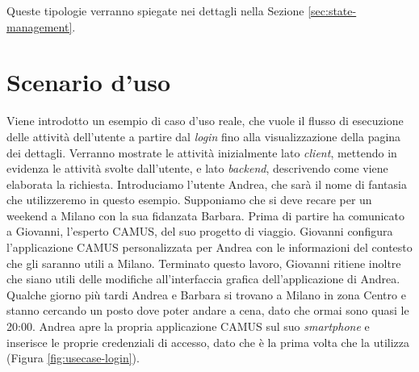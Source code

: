 Queste tipologie verranno spiegate nei dettagli nella Sezione \ref{sec:state-management}.

\section{Scenario d'uso}
Viene introdotto un esempio di caso d'uso reale, che vuole il flusso di esecuzione delle attività dell'utente a partire dal \emph{login} fino alla visualizzazione della pagina dei dettagli. Verranno mostrate le attività inizialmente lato \emph{client}, mettendo in evidenza le attività svolte dall’utente, e lato \emph{backend}, descrivendo come viene elaborata la richiesta.
Introduciamo l'utente Andrea, che sarà il nome di fantasia che utilizzeremo in questo esempio. Supponiamo che si deve recare per un weekend a Milano con la sua fidanzata Barbara. Prima di partire ha comunicato a Giovanni, l’esperto CAMUS, del suo progetto di viaggio. Giovanni configura l’applicazione CAMUS personalizzata per Andrea con le informazioni del contesto che gli saranno utili a Milano. Terminato questo lavoro, Giovanni ritiene inoltre che siano utili delle modifiche all'interfaccia grafica dell'applicazione di Andrea.
Qualche giorno più tardi Andrea e Barbara si trovano a Milano in zona Centro e stanno cercando un posto dove poter andare a cena, dato che ormai sono quasi le 20:00. Andrea apre la propria applicazione CAMUS sul suo \textit{smartphone} e inserisce le proprie credenziali di accesso, dato che è la prima volta che la utilizza (Figura \ref{fig:usecase-login}). 

